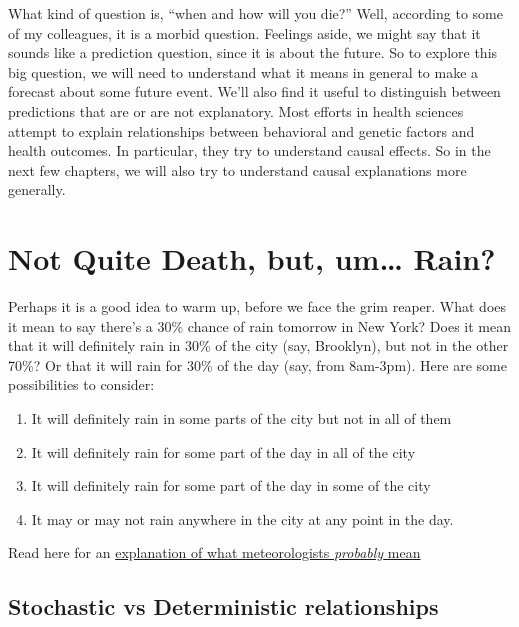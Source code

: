\documentclass[openany]{book}
\providecommand{\tightlist}{%
  \setlength{\itemsep}{0pt}\setlength{\parskip}{0pt}}
\begin{document}
What kind of question is, ``when and how will you die?'' Well, according to some of my colleagues, it is a morbid question. Feelings aside, we might say that it sounds like a prediction question, since it is about the future. So to explore this big question, we will need to understand what it means in general to make a forecast about some future event. We'll also find it useful to distinguish between predictions that are or are not explanatory. Most efforts in health sciences attempt to explain relationships between behavioral and genetic factors and health outcomes. In particular, they try to understand causal effects. So in the next few chapters, we will also try to understand causal explanations more generally.

\hypertarget{not-quite-death-but-um-rain}{%
\section*{Not Quite Death, but, um\ldots{} Rain?}\label{not-quite-death-but-um-rain}}

Perhaps it is a good idea to warm up, before we face the grim reaper. What does it mean to say there's a 30\% chance of rain tomorrow in New York? Does it mean that it will definitely rain in 30\% of the city (say, Brooklyn), but not in the other 70\%? Or that it will rain for 30\% of the day (say, from 8am-3pm). Here are some possibilities to consider:

\begin{enumerate}
\def\labelenumi{\alph{enumi})}
\tightlist
\item
  It will definitely rain in some parts of the city but not in all of them
\item
  It will definitely rain for some part of the day in all of the city
\item
  It will definitely rain for some part of the day in some of the city
\item
  It may or may not rain anywhere in the city at any point in the day.
\end{enumerate}

Read here for an \href{http://wxbrad.com/why-a-50-chance-of-rain-usually-means-a-100-chance-of-confusion/}{explanation of what meteorologists \emph{probably} mean}

\hypertarget{stochastic-vs-deterministic-relationships}{%
\subsection*{Stochastic vs Deterministic relationships}\label{stochastic-vs-deterministic-relationships}}
\end{document}
